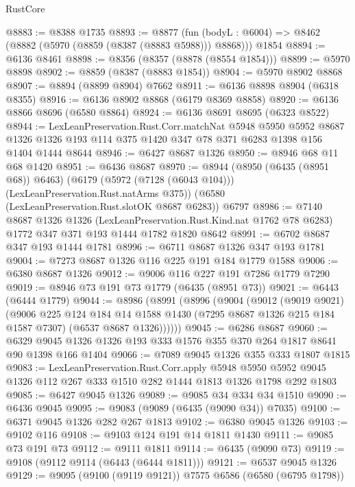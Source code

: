 \begin{lexlean}{RustCore}
\begin{coremodule}
@8883 := @8388 @1735
@8893 := @8877
    (fun (bodyL : @6004) => @8462 (@8882 (@5970 (@8859 (@8387 (@8883 @5988))) @8868)))
    @1854
@8894 := @6136 @8461
@8898 := @8356 (@8357 (@8878 (@8554 @1854)))
@8899 := @5970 @8898
@8902 := @8859 (@8387 (@8883 @1854))
@8904 := @5970 @8902 @8868
@8907 := @8894 (@8899 @8904) @7662
@8911 := @6136 @8898 @8904 (@6318 @8355)
@8916 := @6136 @8902 @8868 (@6179 @8369 @8858)
@8920 := @6136 @8866 @8696 (@6580 @8864)
@8924 := @6136 @8691 @8695 (@6323 @8522)
@8944 := LexLeanPreservation.Rust.Corr.matchNat
    @5948
    @5950
    @5952
    @8687
    @1326
    @1326
    @193
    @114
    @375
    @1420
    @347
    @78
    @371
    @6283
    @1398
    @156
    @1404
    @1444
    @8644
@8946 := @6427 @8687 @1326
@8950 := @8946 @68 @11 @68 @1420
@8951 := @6436 @8687
@8970 := @8944
    (@8950 (@6435 (@8951 @68)) @6463)
    (@6179 (@5972 (@7128 (@6043 @104))) (LexLeanPreservation.Rust.natArms @375))
    (@6580 (LexLeanPreservation.Rust.slotOK @8687 @6283))
    @6797
@8986 := @7140
    @8687
    @1326
    @1326
    (LexLeanPreservation.Rust.Kind.nat @1762 @78 @6283)
    @1772
    @347
    @371
    @193
    @1444
    @1782
    @1820
    @8642
@8991 := @6702 @8687 @347 @193 @1444 @1781
@8996 := @6711 @8687 @1326 @347 @193 @1781
@9004 := @7273 @8687 @1326 @116 @225 @191 @184 @1779 @1588
@9006 := @6380 @8687 @1326
@9012 := @9006 @116 @227 @191 @7286 @1779 @7290
@9019 := @8946 @73 @191 @73 @1779 (@6435 (@8951 @73))
@9021 := @6443 (@6444 @1779)
@9044 := @8986
    (@8991
      (@8996
        (@9004
          (@9012
            (@9019 @9021)
            (@9006
              @225
              @124
              @184
              @14
              @1588
              @1430
              (@7295 @8687 @1326 @215 @184 @1587 @7307)
              (@6537 @8687 @1326))))))
@9045 := @6286 @8687
@9060 := @6329 @9045 @1326 @1326 @193 @333 @1576 @355 @370 @264 @1817 @8641 @90 @1398 @166 @1404
@9066 := @7089 @9045 @1326 @355 @333 @1807 @1815
@9083 := LexLeanPreservation.Rust.Corr.apply
    @5948
    @5950
    @5952
    @9045
    @1326
    @112
    @267
    @333
    @1510
    @282
    @1444
    @1813
    @1326
    @1798
    @292
    @1803
@9085 := @6427 @9045 @1326
@9089 := @9085 @34 @334 @34 @1510
@9090 := @6436 @9045
@9095 := @9083 (@9089 (@6435 (@9090 @34)) @7035)
@9100 := @6371 @9045 @1326 @282 @267 @1813
@9102 := @6380 @9045 @1326
@9103 := @9102 @116
@9108 := @9103 @124 @191 @14 @1811 @1430
@9111 := @9085 @73 @191 @73
@9112 := @9111 @1811
@9114 := @6435 (@9090 @73)
@9119 := @9108 (@9112 @9114 (@6443 (@6444 @1811)))
@9121 := @6537 @9045 @1326
@9129 := @9095 (@9100 (@9119 @9121)) @7575 @6586 (@6580 (@6795 @1798))

\end{coremodule}
\end{lexlean}
